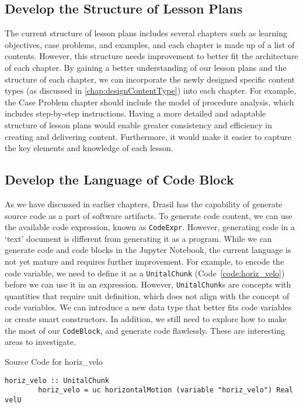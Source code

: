 \subsection{Develop the Structure of Lesson Plans} 
\label{chap:developlsnPlanStruc}
The current structure of lesson plans includes several chapters such as 
learning objectives, case problems, and examples, and each chapter is made up 
of a list of contents. However, this structure needs improvement to better fit 
the architecture of each chapter. By gaining a better understanding of our 
lesson plans and the structure of each chapter, we can incorporate the newly 
designed specific content types (as discussed in \ref{chap:designContentType}) 
into each chapter. For example, the Case Problem chapter should include the 
model of procedure analysis, which includes step-by-step instructions. Having a 
more detailed and adaptable structure of lesson plans would enable greater 
consistency and efficiency in creating and delivering content. Furthermore, it 
would make it easier to capture the key elements and knowledge of each lesson.

\subsection{Develop the Language of Code Block}
As we have discussed in earlier chapters, Drasil has the capability of generate 
source code as a part of software artifacts. To generate code content, we can 
use the available code expression, known as \texttt{CodeExpr}. However, 
generating code in a `text' document is different from generating it as a 
program. While we can generate code and code blocks in the Jupyter Notebook, 
the current language is not yet mature and requires further improvement. For 
example, to encode the code variable, we need to define it as a 
\texttt{UnitalChunk} (Code~\ref{code:horiz_velo}) before we can use it in an 
expression. However, \texttt{UnitalChunk}s are concepts with quantities that 
require unit definition, which does not align with the concept of code 
variables. We can introduce a new data type that better fits code variables or 
create smart constructors. In addition, we still need to explore how to make 
the most of our \texttt{CodeBlock}, and generate code flawlessly. These are 
interesting areas to investigate.

\begin{listing}[h!]
	\caption{Source Code for horiz\_velo}
	\label{code:horiz_velo}
	\begin{lstlisting}[language=haskell1]
		horiz_velo :: UnitalChunk
		horiz_velo = uc horizontalMotion (variable "horiz_velo") Real velU 
	\end{lstlisting}
\end{listing}

